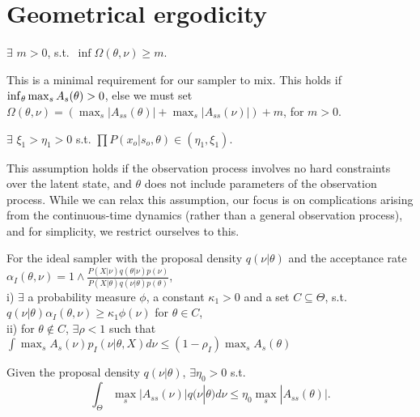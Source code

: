 \section{Geometrical ergodicity}
\begin{assumption}
  $\exists$ $m > 0$, s.t.\ $\inf \Omega(\theta,\nu) \ge m$.
\end{assumption}
\noindent This is a minimal requirement for our sampler to mix. This holds
if
$\inf_\theta {\max_s A_s}(\theta) > 0$, else we must set 
$\Omega(\theta, \nu) = \left(  \max_s|A_{ss}(\theta)| +  
\max_s|A_{ss}(\nu)| \right) + m$, for $m > 0$. 

\begin{assumption}
$\exists$ $ \xi_1 > \eta_1 > 0$ s.t. $\prod P(x_o | s_o, \theta) \in (\eta_1, \xi_1)$.
\end{assumption}
\noindent This assumption holds if the observation process involves no hard
constraints over the latent state, and $\theta$ does not include
parameters of the observation process. While we can relax this assumption,
our focus is on complications arising from the continuous-time dynamics
(rather than a general observation process), and for simplicity, we 
restrict ourselves to this.

\begin{assumption}
For the ideal sampler with the proposal density $q(\nu| \theta)$ and the 
acceptance rate $\alpha_I(\theta, \nu) = 1 \wedge 
\frac{P(X | \nu)q(\theta| \nu)p(\nu)}{P(X | \theta)q(\nu|
\theta)p(\theta)}$, \\
i) $\exists$ a probability measure $\phi$, a constant $\kappa_1 > 0$ and a
set $C \subseteq \Theta$, s.t. $q(\nu | \theta) \alpha_I(\theta, \nu) \geq
\kappa_1 \phi(\nu)$ for $\theta \in C$, \\
ii) for $\theta \not\in C$, $\exists \rho < 1$ such that
$\int \max_sA_s(\nu) p_I(\nu|\theta,X) d\nu 
\leq (1-\rho_I) \max_sA_s(\theta)$
\end{assumption}

\begin{assumption}
Given the proposal density $q(\nu | \theta)$, $\exists \eta_0 > 0$ s.t. $$ \int_\Theta \max_s|A_{ss}(\nu)| q(\nu | \theta)d\nu \leq \eta_0 \max_s|A_{ss}(\theta)|.$$
\end{assumption}

